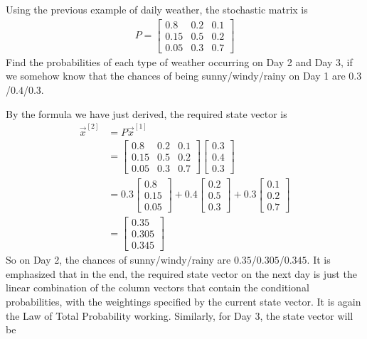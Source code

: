 \begin{exmp}
\label{exmp:weathermarkov}
Using the previous example of daily weather, the stochastic matrix is
\begin{align*}
P = 
\begin{bmatrix}
0.8 & 0.2 & 0.1\\
0.15 & 0.5 & 0.2 \\
0.05 & 0.3 & 0.7
\end{bmatrix}   
\end{align*}
Find the probabilities of each type of weather occurring on Day 2 and Day 3, if we somehow know that the chances of being sunny/windy/rainy on Day 1 are $0.3$/$0.4$/$0.3$. 
\end{exmp}
\begin{solution}
By the formula we have just derived, the required state vector is
\begin{align*}
\vec{x}^{[2]} &= P\vec{x}^{[1]} \\
&=
\begin{bmatrix}
0.8 & 0.2 & 0.1\\
0.15 & 0.5 & 0.2 \\
0.05 & 0.3 & 0.7
\end{bmatrix}   
\begin{bmatrix}
0.3 \\
0.4 \\
0.3
\end{bmatrix} \\
&= 0.3
\begin{bmatrix}
0.8 \\
0.15 \\
0.05
\end{bmatrix}
+ 0.4
\begin{bmatrix}
0.2 \\
0.5 \\
0.3
\end{bmatrix}
+ 0.3
\begin{bmatrix}
0.1 \\
0.2 \\
0.7
\end{bmatrix} \\
&=
\begin{bmatrix}
0.35 \\
0.305 \\
0.345
\end{bmatrix}
\end{align*}
So on Day 2, the chances of sunny/windy/rainy are $0.35$/$0.305$/$0.345$. It is emphasized that in the end, the required state vector on the next day is just the linear combination of the column vectors that contain the conditional probabilities, with the weightings specified by the current state vector. It is again the Law of Total Probability working. Similarly, for Day 3, the state vector will be

\end{solution}
